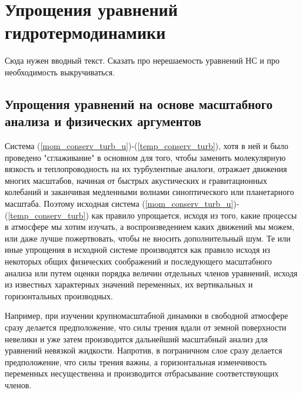 \chapter{{\color{done}Упрощения уравнений гидротермодинамики}}
    \begin{warn}
    Сюда нужен вводный текст. Сказать про нерешаемость уравнений НС и про необходимость выкручиваться. 
    \end{warn}

\section{{\color{done}Упрощения уравнений на основе масштабного анализа и физических аргументов}}

Система (\ref{mom_conserv_turb_u})-(\ref{temp_conserv_turb}), хотя в ней и было проведено "сглаживание" в основном для того, чтобы заменить молекулярную вязкость и теплопроводность на их турбулентные аналоги, отражает движения многих масштабов, начиная от быстрых акустических и гравитационных колебаний и заканчивая медленными волнами синоптического или планетарного масштаба. Поэтому исходная система (\ref{mom_conserv_turb_u})-(\ref{temp_conserv_turb}) как правило упрощается, исходя из того, какие процессы в атмосфере мы хотим изучать, а воспроизведением каких движений мы можем, или даже лучше пожертвовать, чтобы не вносить дополнительный шум. Те или иные упрощения в исходной системе производятся как правило исходя из некоторых общих физических соображений и последующего масштабного анализа или путем оценки порядка величин отдельных членов уравнений, исходя из известных характерных значений переменных, их вертикальных и горизонтальных производных.

Например, при изучении крупномасштабной динамики в свободной атмосфере сразу делается предположение, что силы трения вдали от земной поверхности невелики и уже затем производится дальнейший масштабный анализ для уравнений невязкой жидкости. Напротив, в пограничном слое сразу делается предположение, что силы трения важны, а горизонтальная изменчивость переменных несущественна и производится отбрасывание соответствующих членов.

